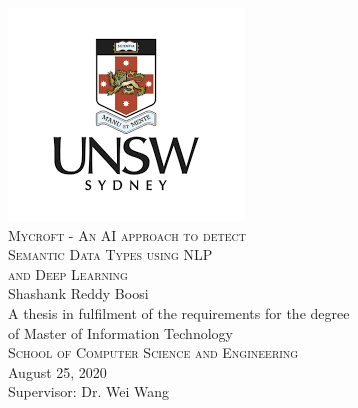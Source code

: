 \documentclass[12pt, a4paper]{report}
\theoremstyle{definition}
\numberwithin{equation}{chapter}
\numberwithin{figure}{chapter}
\numberwithin{table}{chapter}
\begin{document}

\begin{spacing}{1.5}
\begin{titlepage}


\center %
 

\includegraphics{./Pics/unsw_logo.png} \\ [0.5cm]

{ \textsc{\LARGE Mycroft - An AI approach to detect }} \\ [0.5cm]
{ \textsc{\LARGE Semantic Data Types using NLP }} \\ [0.5cm]
{ \textsc{\LARGE and Deep Learning}}\\[1.5cm]

{ \large Shashank Reddy Boosi} \\[2.0cm]
{\large A thesis in fulfilment of the requirements for the degree} \\ [0.25cm]
{\large of Master of Information Technology}\\[1.5cm]


{\textsc{\large School of Computer Science and Engineering}}\\[1.0cm]

{ \large August 25, 2020}\\[1.5cm]

{\large Supervisor: Dr. Wei Wang}

\end{titlepage}
\end{spacing}
\end{document}
